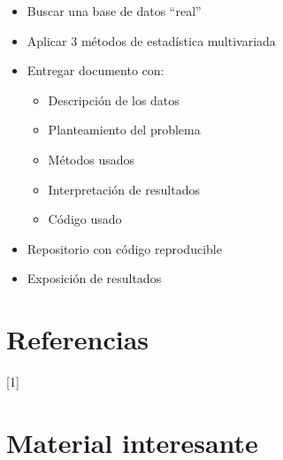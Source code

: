 \documentclass[
]{book}
\providecommand{\tightlist}{%
  \setlength{\itemsep}{0pt}\setlength{\parskip}{0pt}}
\begin{document}
\begin{itemize}
\tightlist
\item
  Buscar una base de datos ``real''
\item
  Aplicar 3 métodos de estadística multivariada
\item
  Entregar documento con:

  \begin{itemize}
  \tightlist
  \item
    Descripción de los datos
  \item
    Planteamiento del problema
  \item
    Métodos usados
  \item
    Interpretación de resultados
  \item
    Código usado
  \end{itemize}
\item
  Repositorio con código reproducible
\item
  Exposición de resultados
\end{itemize}

\section{Referencias}\label{referencias}

{[}1{]}

\section{Material interesante}\label{material-interesante}
\end{document}
